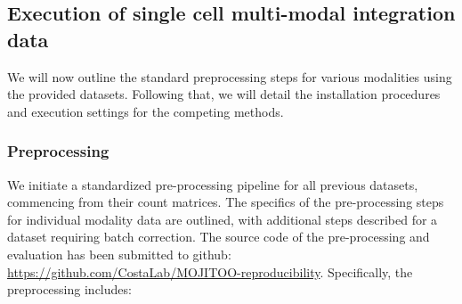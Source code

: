 \subsection{Execution of single cell multi-modal integration data}
\label{MOJITOO:exp:run}
We will now outline the standard preprocessing steps for various modalities using the provided datasets. Following that, we will detail the installation procedures and execution settings for the competing methods.

\subsubsection{Preprocessing}
\label{MOJITOO:exp:preprocessing}
We initiate a standardized pre-processing pipeline for all previous datasets, commencing from their count matrices. The specifics of the pre-processing steps for individual modality data are outlined, with additional steps described for a dataset requiring batch correction. The source code of the pre-processing and evaluation has been submitted to github: \url{https://github.com/CostaLab/MOJITOO-reproducibility}. Specifically, the preprocessing includes:
